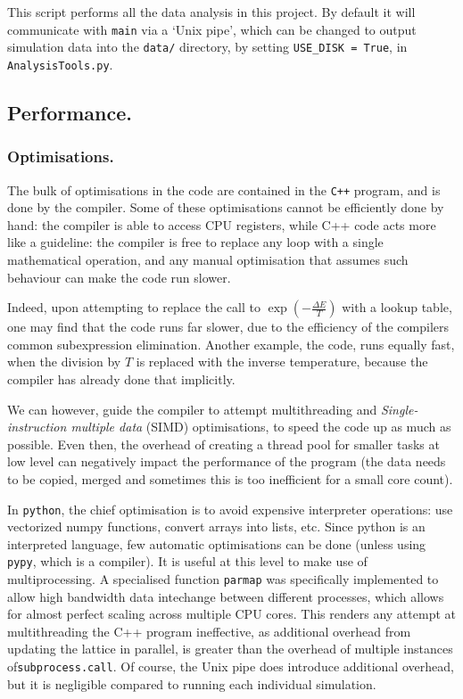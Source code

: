 \documentclass[12pt]{article}
\begin{document}
This script performs all the data analysis in this project. By default it will communicate with \texttt{main} via a `Unix pipe', which can be changed to output simulation data into the \texttt{data/} directory, by setting \texttt{USE\_DISK = True}, in \texttt{AnalysisTools.py}.

\subsection{Performance.}

\subsubsection{Optimisations.}

The bulk of optimisations in the code are contained in the \texttt{C++} program, and is done by the compiler. Some of these optimisations cannot be efficiently done by hand: the compiler is able to access CPU registers, while C++ code acts more like a guideline: the compiler is free to replace any loop with a single mathematical operation, and any manual optimisation that assumes such behaviour can make the code run slower.

Indeed, upon attempting to replace the call to \( \exp (- \frac{\Delta E} {T} )\) with a lookup table, one may find that the code runs far slower, due to the efficiency of the compilers common subexpression elimination. Another example, the code, runs equally fast, when the division by \(T\) is replaced with the inverse temperature, because the compiler has already done that implicitly.

We can however, guide the compiler to attempt multithreading and \emph{Single-instruction multiple data} (SIMD) optimisations, to speed the code up as much as possible. Even then, the overhead of creating a thread pool for smaller tasks at low level can negatively impact the performance of the program (the data needs to be copied, merged and sometimes this is too inefficient for a small core count). 

In \texttt{python}, the chief optimisation is to avoid expensive interpreter operations: use vectorized numpy functions, convert arrays into lists, etc. Since python is an interpreted language, few automatic optimisations can be done (unless using \texttt{pypy}, which is a compiler). It is useful at this level to make use of multiprocessing. A specialised function \texttt{parmap} was specifically implemented to allow high bandwidth data intechange between different processes, which allows for almost perfect scaling across multiple CPU cores. This renders any attempt at multithreading the C++ program ineffective, as additional overhead from updating the lattice in parallel, is greater than the overhead of multiple instances of\texttt{subprocess.call}. Of course, the Unix pipe does introduce additional overhead, but it is negligible compared to running each individual simulation.
\end{document}
